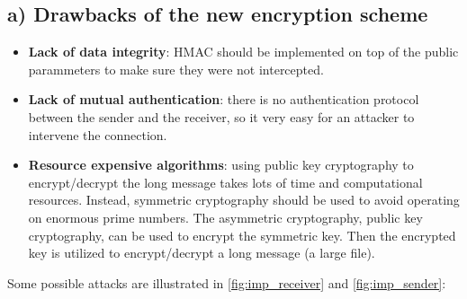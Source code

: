 \subsection*{a) Drawbacks of the new encryption scheme}
%
\begin{itemize}
    \item \textbf{Lack of data integrity}: HMAC should be implemented on top of the
    public parammeters to make sure they were not intercepted.
    \item \textbf{Lack of mutual authentication}: there is no authentication protocol between
    the sender and the receiver, so it very easy for an attacker to intervene the 
    connection.
    \item \textbf{Resource expensive algorithms}: using public key cryptography to
    encrypt/decrypt the long message takes lots of time and computational
    resources. Instead, symmetric cryptography should be used to avoid 
    operating on enormous prime numbers. The asymmetric cryptography, public key
    cryptography, can be used to encrypt the symmetric key. Then the encrypted
    key is utilized to encrypt/decrypt a long message (a large file).
\end{itemize}

Some possible attacks are illustrated in \autoref{fig:imp_receiver} and \autoref{fig:imp_sender}:

